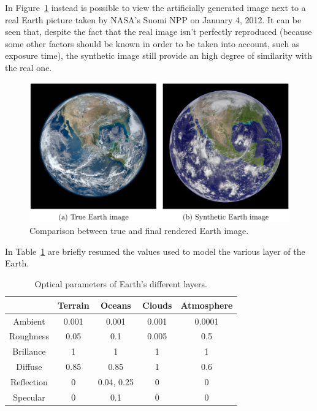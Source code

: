 In Figure~\ref{fig:trueVsFake} instead is possible to view the artificially generated image next to a real Earth picture taken by NASA's Suomi NPP on January 4, 2012.
It can be seen that, despite the fact that the real image isn't perfectly reproduced (because some other factors should be known in order to be taken into account, such as exposure time), the synthetic image still provide an high degree of similarity with the real one.

\begin{figure}[htbp]
  \centering
  \includegraphics[width=1.0\textwidth]{gfx/trueVsFake.eps}
  \caption{Comparison between true \cite{bluemarble} and final rendered Earth image.}
  \label{fig:trueVsFake}
\end{figure}

In Table~\ref{tab:EarthParameters} are briefly resumed the values used to model the various layer of the Earth.

\begin{table}[htbp]
  \centering
  \begin{tabular}{c cccc}
    \hline
    \hline
               & Terrain & Oceans       & Clouds & Atmosphere \\
    \hline
    Ambient    & 0.001   & 0.001        & 0.001  & 0.0001     \\
    Roughness  & 0.05    & 0.1          & 0.005  & 0.5        \\
    Brillance  & 1       & 1            & 1      & 1          \\
    Diffuse    & 0.85    & 0.85         & 1      & 0.6        \\
    Reflection & 0       & {0.04, 0.25} & 0      & 0          \\
    Specular   & 0       & 0.1          & 0      & 0          \\
    \hline
    \hline
  \end{tabular}
  \caption{Optical parameters of Earth's different layers.}
  \label{tab:EarthParameters}
\end{table}

